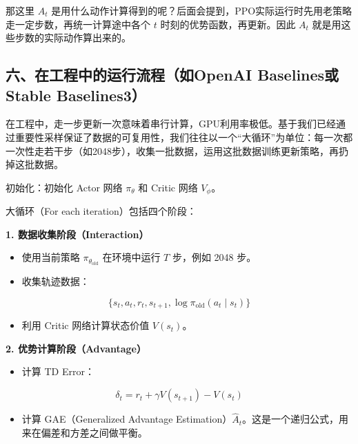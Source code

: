 那这里 \(A_t\) 是用什么动作计算得到的呢？后面会提到，PPO实际运行时先用老策略走一定步数，再统一计算途中各个 \(t\) 时刻的优势函数，再更新。因此 \(A_t\) 就是用这些步数的实际动作算出来的。

\hypertarget{ux516dux5728ux5de5ux7a0bux4e2dux7684ux8fd0ux884cux6d41ux7a0bux5982openai-baselinesux6216stable-baselines3}{%
\subsection{六、在工程中的运行流程（如OpenAI Baselines或Stable Baselines3）}\label{ux516dux5728ux5de5ux7a0bux4e2dux7684ux8fd0ux884cux6d41ux7a0bux5982openai-baselinesux6216stable-baselines3}}

在工程中，走一步更新一次意味着串行计算，GPU利用率极低。基于我们已经通过重要性采样保证了数据的可复用性，我们往往以一个``大循环''为单位：每一次都一次性走若干步（如2048步），收集一批数据，运用这批数据训练更新策略，再扔掉这批数据。

初始化：初始化 Actor 网络 \(\pi_\theta\) 和 Critic 网络 \(V_\phi\)。

大循环（For each iteration）包括四个阶段：

\textbf{1. 数据收集阶段（Interaction）}

\begin{itemize}
\tightlist
\item
  使用当前策略 \(\pi_{\theta_{\mathrm{old}}}\) 在环境中运行 \(T\) 步，例如 2048 步。
\item
{}
  收集轨迹数据：
\end{itemize}

\[
\{s_t,a_t,r_t,s_{t+1},\log\pi_{\mathrm{old}}(a_t\mid s_t)\}
\]

\begin{itemize}
\tightlist
\item
  利用 Critic 网络计算状态价值 \(V(s_t)\)。
\end{itemize}

\textbf{2. 优势计算阶段（Advantage）}

\begin{itemize}
\tightlist
\item
{}
  计算 TD Error：
\end{itemize}

\[
\delta_t=r_t+\gamma V(s_{t+1})-V(s_t)
\]

\begin{itemize}
\tightlist
\item
  计算 GAE（Generalized Advantage Estimation）\(\hat{A}_t\)。这是一个递归公式，用来在偏差和方差之间做平衡。
\end{itemize}

